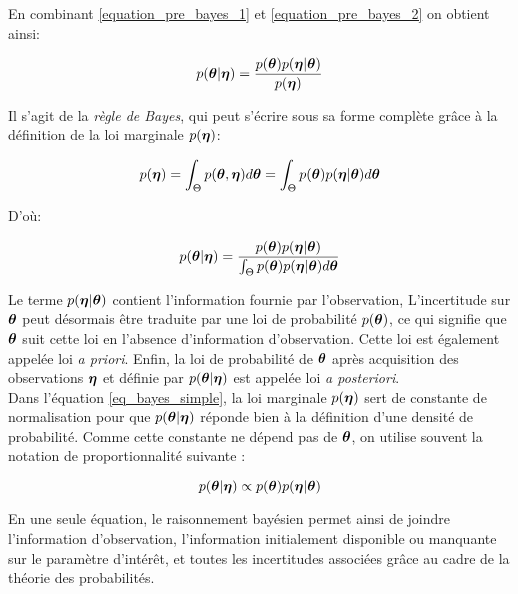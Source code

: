 	En combinant \eqref{equation_pre_bayes_1} et \eqref{equation_pre_bayes_2} on obtient ainsi:
	
	\begin{equation}
		p({\bm{\theta}} | {\bm{\eta}}) = \dfrac{p({\bm{\theta}})p({\bm{\eta}} | {\bm{\theta}})}{p({\bm{\eta}})}
		\label{eq_bayes_simple}
	\end{equation}
	
	Il s'agit de la \textit{règle de Bayes}, qui peut s'écrire sous sa forme complète grâce à la définition de la loi marginale $p({\bm{\eta}})$:
	
	\begin{equation}
		p({\bm{\eta}}) = \int_{\Theta} p({\bm{\theta}},{\bm{\eta}})d{\bm{\theta}} = \int_{\Theta} p({\bm{\theta}})p({\bm{\eta}}|{\bm{\theta}})d{\bm{\theta}}
		\label{eq_definition_marginale_d}
	\end{equation}
	
	D'où:

	\begin{equation}
	p({\bm{\theta}} | {\bm{\eta}}) = \dfrac{p({\bm{\theta}})p({\bm{\eta}} | {\bm{\theta}})}{ \int_{\Theta} p({\bm{\theta}})p({\bm{\eta}}|{\bm{\theta}})d{\bm{\theta}}}
	\label{eq_bayes_simple}
	\end{equation}
	
	Le terme $p({\bm{\eta}}|{\bm{\theta}})$ contient l'information fournie par l'observation,  
	L'incertitude sur ${\bm{\theta}}$ peut désormais être traduite par une loi de probabilité $p({\bm{\theta}})$, ce qui signifie que ${\bm{\theta}}$ suit cette loi en l'absence d'information d'observation. Cette loi est également appelée loi  \textit{a priori}. 
	Enfin, la loi de probabilité de ${\bm{\theta}}$ après acquisition des observations ${\bm{\eta}}$ et définie par  	$p({\bm{\theta}} | {\bm{\eta}})$ est appelée loi \textit{a posteriori}.\\
	
	Dans l'équation \eqref{eq_bayes_simple}, la loi marginale $p({\bm{\eta}})$ sert de constante de normalisation pour que $p({\bm{\theta}} | {\bm{\eta}})$ réponde bien à la définition d'une densité de probabilité. Comme cette constante ne dépend pas de ${\bm{\theta}}$, on utilise souvent la notation de proportionnalité suivante : 
	
	\begin{equation}
	p({\bm{\theta}} | {\bm{\eta}}) \propto p({\bm{\theta}})p({\bm{\eta}} | {\bm{\theta}})
	\label{eq_bayes_proportionnalite}
	\end{equation}
	
	En une seule équation, le raisonnement bayésien permet ainsi de joindre l'information d'observation, l'information initialement disponible ou manquante sur le paramètre d'intérêt, et toutes les incertitudes associées grâce au cadre de la théorie des probabilités.
	
